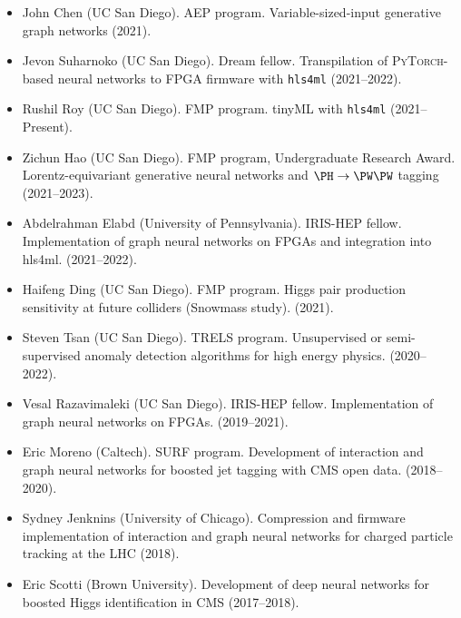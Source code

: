 \documentclass[11pt]{res}
\begin{document}
\begin{resume}
\begin{itemize}
    \item John Chen (UC San Diego). AEP program. Variable-sized-input generative graph networks ({2021}).
    \item Jevon Suharnoko (UC San Diego). Dream fellow. Transpilation of \textsc{PyTorch}-based neural networks to FPGA firmware with \texttt{hls4ml} ({2021--2022}).
    \item Rushil Roy (UC San Diego). FMP program. tinyML with \texttt{hls4ml} ({2021--Present}).
    \item Zichun Hao (UC San Diego). FMP program, Undergraduate Research Award. Lorentz-equivariant generative neural networks and $\PH\to\PW\PW$ tagging ({2021--2023}).
    \item Abdelrahman Elabd (University of Pennsylvania). IRIS-HEP fellow. Implementation of graph neural networks on FPGAs and integration into hls4ml. ({2021--2022}).
    \item Haifeng Ding (UC San Diego). FMP program. Higgs pair production sensitivity at future colliders (Snowmass study). ({2021}).
    \item Steven Tsan (UC San Diego). TRELS program. Unsupervised or semi-supervised anomaly detection algorithms for high energy physics. ({2020--2022}).
    \item Vesal Razavimaleki (UC San Diego). IRIS-HEP fellow. Implementation of graph neural networks on FPGAs. ({2019--2021}).
    \item Eric Moreno (Caltech). SURF program. Development of interaction and graph neural networks for boosted jet tagging with CMS open data. ({2018--2020}).
    \item Sydney Jenknins (University of Chicago). Compression and firmware implementation of interaction and graph neural networks for charged particle tracking at the LHC ({2018}).
    \item Eric Scotti (Brown University). Development of deep neural networks for boosted Higgs identification in CMS ({2017--2018}).
\end{itemize}
\end{resume}
\end{document}
